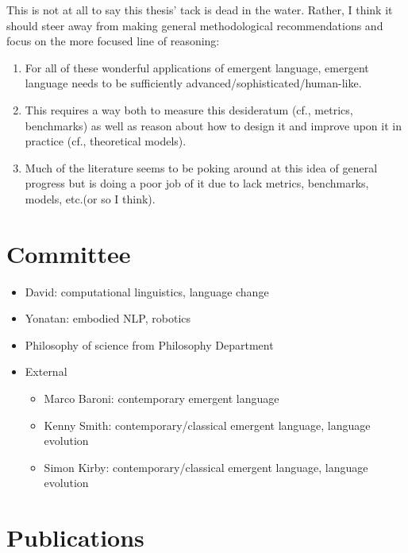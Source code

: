 This is not at all to say this thesis' tack is dead in the water.
Rather, I think it should steer away from making general methodological recommendations and focus on the more focused line of reasoning:
\begin{enumerate}
    \item For all of these wonderful applications of emergent language, emergent language needs to be sufficiently advanced/sophisticated/human-like.
    \item This requires a way both to measure this desideratum (cf., metrics, benchmarks) as well as reason about how to design it and improve upon it in practice (cf., theoretical models).
    \item Much of the literature seems to be poking around at this idea of general progress but is doing a poor job of it due to lack metrics, benchmarks, models, etc.\@ (or so I think).
\end{enumerate}


\section{Committee}
\begin{itemize}
    \item David: computational linguistics, language change
    \item Yonatan: embodied NLP, robotics
    \item {} Philosophy of science from Philosophy Department
    \item {} External
        \begin{itemize}
        \item Marco Baroni: contemporary emergent language
        \item Kenny Smith: contemporary/classical emergent language, language evolution
        \item Simon Kirby: contemporary/classical emergent language, language evolution
        \end{itemize}
\end{itemize}

\section{Publications}

